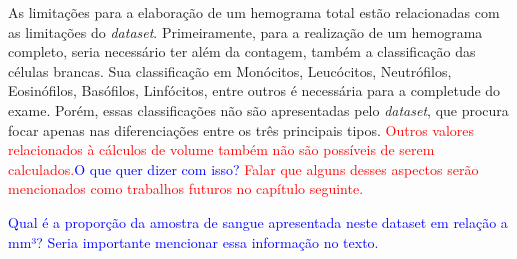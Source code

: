 As limitações para a elaboração de um hemograma total estão relacionadas com as limitações do \emph{dataset}. Primeiramente, para a realização de um hemograma completo, seria necessário ter além da contagem, também a classificação das células brancas. Sua classificação em Monócitos, Leucócitos, Neutrófilos, Eosinófilos, Basófilos, Linfócitos, entre outros é necessária para a completude do exame. Porém, essas classificações não são apresentadas pelo \emph{dataset}, que procura focar apenas nas diferenciações entre os três principais tipos. \textcolor{red}{Outros valores relacionados à cálculos de volume também não são possíveis de serem calculados.}\textcolor{blue}{O que quer dizer com isso?} \textcolor{red}{Falar que alguns desses aspectos serão mencionados como trabalhos futuros no capítulo seguinte.}

\textcolor{blue}{Qual é a proporção da amostra de sangue apresentada neste dataset em relação a mm³? Seria importante mencionar essa informação no texto.}